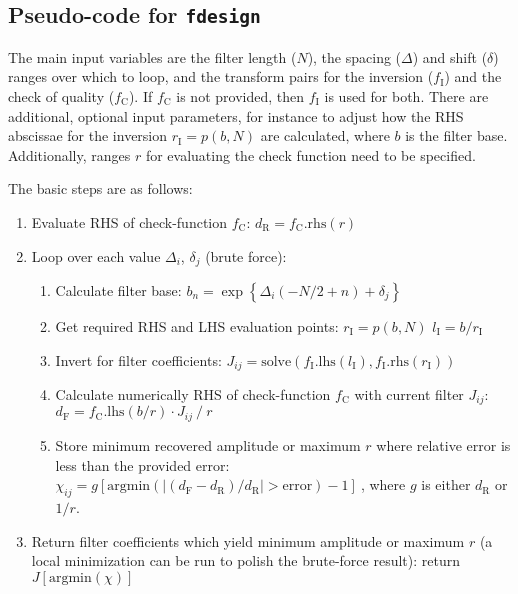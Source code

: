\documentclass[paper,twocolumn,twoside]{geophysics}
\newcommand{\mr}[1]{\mathrm{#1}}
\begin{document}
\subsection{Pseudo-code for \texttt{fdesign} }

The main input variables are the filter length ($N$), the spacing ($\Delta$)
and shift ($\delta$) ranges over which to loop, and the transform pairs for the
inversion ($f_\mr{I}$) and the check of quality ($f_\mr{C}$). If $f_\mr{C}$ is
not provided, then $f_\mr{I}$ is used for both. There are additional, optional
input parameters, for instance to adjust how the RHS abscissae for the
inversion $r_\mr{I} = p(b, N)$ are calculated, where $b$ is the filter base.
Additionally, ranges $r$ for evaluating the check function need to be
specified.

The basic steps are as follows:
\begin{enumerate}
  \item Evaluate RHS of check-function $f_\mr{C}$:\newline
        $d_\mr{R} = f_\mr{C}.\mr{rhs}(r)$
  \item Loop over each value $\Delta_i$, $\delta_j$ (brute force):
    \begin{enumerate}
      \item Calculate filter base:\newline
        $b_n = \exp\left\{\Delta_i(-N/2+n) + \delta_j\right\}$
      \item Get required RHS and LHS evaluation points:\newline
        $r_\mr{I} = p(b, N)$\newline
        $l_\mr{I} = b/r_\mr{I}$
      \item Invert for filter coefficients:\newline
        $J_{ij} = \mr{solve}(f_\mr{I}.\mr{lhs}(l_\mr{I}),
        f_\mr{I}.\mr{rhs}(r_\mr{I}))$
    \item Calculate numerically RHS of check-function $f_\mr{C}$ with current
      filter $J_{ij}$:\newline
      $d_\mr{F} = f_\mr{C}.\mr{lhs}(b/r)\cdot J_{ij}\ /\ r$
      \item Store minimum recovered amplitude or maximum $r$ where relative
        error is less than the provided error:\newline
        $\chi_{ij} = g\left[
        \mr{argmin}\left(|(d_\mr{F}-d_\mr{R})/d_\mr{R}| >
        \mr{error}\right) -1\right]\ $, where $g$ is either $d_\mr{R}$
        or $1/r$.
    \end{enumerate}
  \item Return filter coefficients which yield minimum amplitude or maximum $r$
    (a local minimization can be run to polish the brute-force result):\newline
    return $J\left[\mr{argmin}(\chi)\right] $\newline
\end{enumerate}
\end{document}

